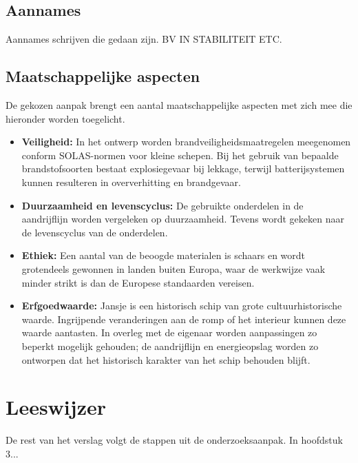 \subsection{Aannames}
Aannames schrijven die gedaan zijn. BV IN STABILITEIT ETC.


\subsection{Maatschappelijke aspecten}
De gekozen aanpak brengt een aantal maatschappelijke aspecten met zich mee die hieronder worden toegelicht.

\begin{itemize}
    \item \textbf{Veiligheid:} In het ontwerp worden brandveiligheidsmaatregelen meegenomen conform SOLAS-normen \cite{imo_solas_1974} voor kleine schepen. Bij het gebruik van bepaalde brandstofsoorten bestaat explosiegevaar bij lekkage, terwijl batterijsystemen kunnen resulteren in oververhitting en brandgevaar.
    \item \textbf{Duurzaamheid en levenscyclus:} De gebruikte onderdelen in de aandrijflijn worden vergeleken op duurzaamheid. Tevens wordt gekeken naar de levenscyclus van de onderdelen.
    \item \textbf{Ethiek:} Een aantal van de beoogde materialen is schaars en wordt grotendeels gewonnen in landen buiten Europa, waar de werkwijze vaak minder strikt is dan de Europese standaarden \cite{ec_green_claims_2023}  vereisen.
    \item \textbf{Erfgoedwaarde:} Jansje is een historisch schip van grote cultuurhistorische waarde. Ingrijpende veranderingen aan de romp of het interieur kunnen deze waarde aantasten. In overleg met de eigenaar worden aanpassingen zo beperkt mogelijk gehouden; de aandrijflijn en energieopslag worden zo ontworpen dat het historisch karakter van het schip behouden blijft.
\end{itemize}


\section{Leeswijzer}
De rest van het verslag volgt de stappen uit de onderzoeksaanpak. In hoofdstuk 3...